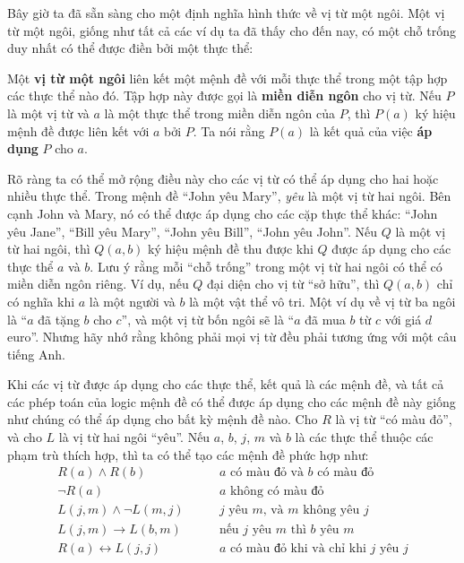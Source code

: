 Bây giờ ta đã sẵn sàng cho một định nghĩa hình thức về vị từ một ngôi. Một vị từ một ngôi, giống như tất cả các ví dụ ta đã thấy cho đến nay, có một chỗ trống duy nhất có thể được điền bởi một thực thể:

\begin{definition}
Một \textbf{vị từ một ngôi} liên kết một mệnh đề với mỗi thực thể trong một tập hợp các thực thể nào đó. Tập hợp này được gọi là \textbf{miền diễn ngôn} cho vị từ. Nếu $P$ là một vị từ và $a$ là một thực thể trong miền diễn ngôn của $P$, thì $P(a)$ ký hiệu mệnh đề được liên kết với $a$ bởi $P$. Ta nói rằng $P(a)$ là kết quả của việc \textbf{áp dụng} $P$ cho $a$.
\end{definition}

Rõ ràng ta có thể mở rộng điều này cho các vị từ có thể áp dụng cho hai hoặc nhiều thực thể. Trong mệnh đề ``John yêu Mary'', \textit{yêu} là một vị từ hai ngôi. Bên cạnh John và Mary, nó có thể được áp dụng cho các cặp thực thể khác: ``John yêu Jane'', ``Bill yêu Mary'', ``John yêu Bill'', ``John yêu John''. Nếu $Q$ là một vị từ hai ngôi, thì $Q(a,b)$ ký hiệu mệnh đề thu được khi $Q$ được áp dụng cho các thực thể $a$ và $b$. Lưu ý rằng mỗi ``chỗ trống'' trong một vị từ hai ngôi có thể có miền diễn ngôn riêng. Ví dụ, nếu $Q$ đại diện cho vị từ ``sở hữu'', thì $Q(a,b)$ chỉ có nghĩa khi $a$ là một người và $b$ là một vật thể vô tri. Một ví dụ về vị từ ba ngôi là ``$a$ đã tặng $b$ cho $c$'', và một vị từ bốn ngôi sẽ là ``$a$ đã mua $b$ từ $c$ với giá $d$ euro''. Nhưng hãy nhớ rằng không phải mọi vị từ đều phải tương ứng với một câu tiếng Anh.

Khi các vị từ được áp dụng cho các thực thể, kết quả là các mệnh đề, và tất cả các phép toán của logic mệnh đề có thể được áp dụng cho các mệnh đề này giống như chúng có thể áp dụng cho bất kỳ mệnh đề nào. Cho $R$ là vị từ ``có màu đỏ'', và cho $L$ là vị từ hai ngôi ``yêu''. Nếu $a$, $b$, $j$, $m$ và $b$ là các thực thể thuộc các phạm trù thích hợp, thì ta có thể tạo các mệnh đề phức hợp như:
\begin{align*}
R(a) \land R(b) & \qquad \text{$a$ có màu đỏ và $b$ có màu đỏ} \\
\neg R(a) & \qquad \text{$a$ không có màu đỏ} \\
L(j,m) \land \neg L(m,j) & \qquad \text{$j$ yêu $m$, và $m$ không yêu $j$} \\
L(j,m) \to L(b,m) & \qquad \text{nếu $j$ yêu $m$ thì $b$ yêu $m$} \\
R(a) \leftrightarrow L(j,j) & \qquad \text{$a$ có màu đỏ khi và chỉ khi $j$ yêu $j$}
\end{align*}

